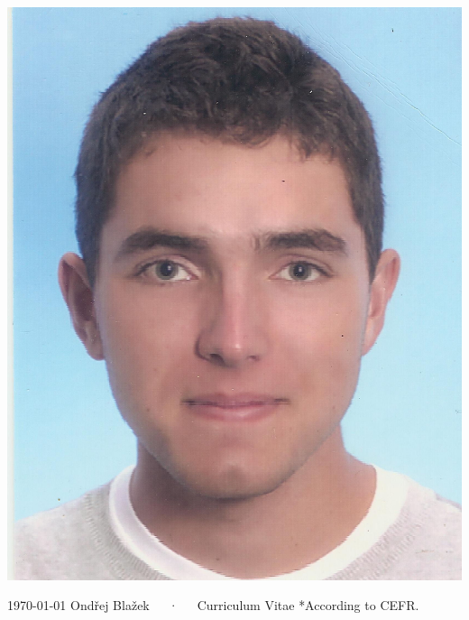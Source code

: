 \documentclass[11pt, a4paper]{awesome-cv}
\begin{document}
\makecvheader[L]

  \begin{center}
  \includegraphics[scale=0.5]{OndrejBlazek.jpg} 
  \end{center}
\makecvfooter
  {\today}
  {Ondřej Blažek~~~·~~~Curriculum Vitae}
  {*According to CEFR.}




%


%
%
%
%
%


\end{document}
